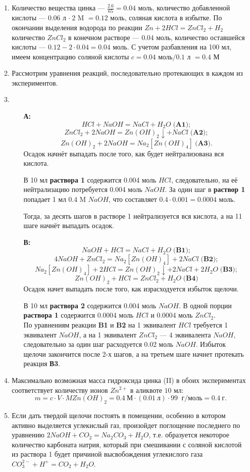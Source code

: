 \solutionSection

\begin{enumerate}
\item Количество вещества цинка — $\frac{2.6}{65} = 0.04$ моль, количество добавленной кислоты — $0.06$ л $\cdot\:2$ M $= 0.12$ моль, соляная кислота в избытке. По окончании выделения водорода по реакции $Zn + 2HCl = ZnCl_2 + H_2$ количество $ZnCl_2$ в конечном растворе — $0.04$ моль, количество оставшейся кислоты — $0.12-2\cdot0.04 = 0.04$ моль. С учетом разбавления на 100 мл, имеем концентрацию соляной кислоты $c = 0.04$ моль$/0.1$ л $= 0.4$ М
\item Рассмотрим уравнения реакций, последовательно протекающих в каждом из экспериментов.
\item 
\begin{enumerate}
\item [\textbf{А:}]
$$HCl + NaOH = NaCl + H_2O\;\textbf{(A1)};$$
$$ZnCl_2 + 2NaOH = Zn(OH)_2\downarrow + NaCl\;\textbf{(A2)};$$
$$Zn(OH)_2 + 2NaOH = Na_2[Zn(OH)_4]\;\textbf{(A3)}.$$
Осадок начнёт выпадать после того, как будет нейтрализована вся кислота.

В 10 мл \textbf{раствора 1} содержится 0.004 моль $HCl$, следовательно, на её нейтрализацию потребуется 0.004 моль $NaOH$.
За один шаг в \textbf{раствор 1} попадает 1 мл 0.4 M $NaOH$, что составляет $0.4\cdot0.001=0.0004$ моль.

Тогда, за десять шагов в растворе 1 нейтрализуется вся кислота, а на 11 шаге начнёт выпадать осадок.
\item [\textbf{В:}]
$$NaOH+HCl = NaCl + H_2O\;\textbf{(B1)};$$
$$4NaOH + ZnCl_2 = Na_2[Zn(OH)_4] + 2NaCl\;\textbf{(B2)};$$
$$Na_2[Zn(OH)_4] + 2HCl = Zn(OH)_2\downarrow + 2NaCl + 2H_2O\;\textbf{(B3)};$$
$$Zn(OH)_2 + HCl = ZnCl_2 + H_2O\;\textbf{(B4)}$$
Осадок начет выпадать после того, как израсходуется избыток щелочи.

В 10 мл \textbf{раствора 2} содержится 0.004 моль $NaOH$. В одной порции \textbf{раствора 1} содержится 0.0004 моль $HCl$ и 0.0004 моль $ZnCl_2$.\\
По уравнениям реакции \textbf{B1} и \textbf{B2} на 1 эквивалент $HCl$ требуется 1 эквивалент $NaOH$, а на 1 эквивалент $ZnCl_2$ — 4 эквивалента $NaOH$, следовательно за один шаг расходуется 0.02 моль $NaOH$. Избыток щелочи закончится после 2-х шагов, а на третьем шаге начнет протекать реакция \textbf{В3}.
\end{enumerate}
\item Максимально возможная масса гидроксида цинка (II) в обоих экспериментах соответствует количеству ионов $Zn^{2+}$ в аликвоте $10$ мл: 
$$m = c\cdot V\cdot MZn(OH)_2 = 0.4 \: \text{М} \cdot(0.01 \: \text{л})\cdot 99 \: \text{ г/моль} = 0.4 \: \text{г}.$$
\item Если дать твердой щелочи постоять в помещении, особенно в котором активно выделяется углекислый газ, произойдет поглощение последнего по уравнению $2NaOH + CO_2 = Na_2CO_3 + H_2O$, т.е. образуется некоторое количество карбоната натрия, который при смешивании с соляной кислотой из раствора 1 будет причиной высвобождения углекислого газа $CO_3^{2-} + H^+ = CO_2 + H_2O$.
\end{enumerate}

